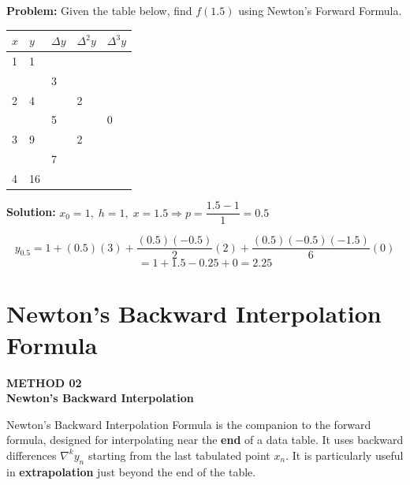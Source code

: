 \documentclass[12pt]{article}
\newcommand{\hcell}[1]{\textbf{\color{white}#1}}
\begin{document}
\begin{examplebox*}
\textbf{Problem:} Given the table below, find $f(1.5)$ using Newton's Forward Formula.

\begin{center}{\small
\begin{tabular}{C{2cm} C{2cm} C{2.5cm} C{2.5cm} C{2.5cm}}
\toprule
{}
\hcell{$x$} & \hcell{$y$} & \hcell{$\Delta y$} & \hcell{$\Delta^2 y$} & \hcell{$\Delta^3 y$} \\
\midrule
{}
1 & 1 & & & \\
  &   & 3 & & \\
2 & 4 & & 2 & \\
  &   & 5 & & 0 \\
3 & 9 & & 2 & \\
  &   & 7 & & \\
4 & 16 & & & \\
\bottomrule
\end{tabular}
}\end{center}

\textbf{Solution:} $x_0=1,\;h=1,\;x=1.5 \Rightarrow p=\dfrac{1.5-1}{1}=0.5$

\[
  y_{0.5} = 1 + (0.5)(3) + \frac{(0.5)(-0.5)}{2}(2) + \frac{(0.5)(-0.5)(-1.5)}{6}(0)
\]
\[
  = 1 + 1.5 - 0.25 + 0 = \boxed{2.25}
\]
\end{examplebox*}

\newpage

\section{Newton's Backward Interpolation Formula}

\begin{tcolorbox}[
  enhanced, arc=0pt, boxrule=0pt,
  colback=primary, colframe=primary,
  left=16pt, right=16pt, top=14pt, bottom=10pt,
  borderline south={4pt}{0pt}{accent},
]
  {\color{accent!70}\small\bfseries METHOD 02}\\[4pt]
  {\LARGE\bfseries\color{white} Newton's Backward Interpolation}
\end{tcolorbox}

\vspace{10pt}

\begin{histbox}
Newton's Backward Interpolation Formula is the companion to the forward formula, designed for interpolating near the \textbf{end} of a data table. It uses backward differences $\nabla^k y_n$ starting from the last tabulated point $x_n$. It is particularly useful in \textbf{extrapolation} just beyond the end of the table.
\end{histbox}
\end{document}
